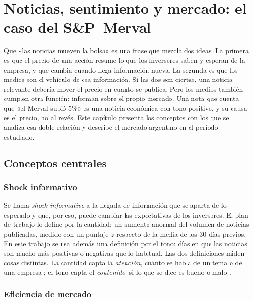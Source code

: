 \chapter{Noticias, sentimiento y mercado: el caso del S\&P~Merval}
\label{cap:marco}

Que «las noticias mueven la bolsa» es una frase que mezcla dos ideas. La primera es que el
precio de una acción resume lo que los inversores saben y esperan de la empresa, y que cambia
cuando llega información nueva. La segunda es que los medios son el vehículo de esa
información. Si las dos son ciertas, una noticia relevante debería mover el precio en cuanto
se publica. Pero los medios también cumplen otra función: informan sobre el propio mercado.
Una nota que cuenta que «el Merval subió 5\%» es una noticia económica con tono positivo, y
su causa es el precio, no al revés. Este capítulo presenta los conceptos con los que se
analiza esa doble relación y describe el mercado argentino en el período estudiado.

\section{Conceptos centrales}
\label{sec:conceptos}

\subsection{Shock informativo}

Se llama \textit{shock informativo} a la llegada de información que se aparta de lo esperado
y que, por eso, puede cambiar las expectativas de los inversores. El plan de trabajo lo define
por la cantidad: un aumento anormal del volumen de noticias publicadas, medido con un puntaje
$z$ respecto de la media de los 30 días previos. En este trabajo se usa además una definición
por el tono: días en que las noticias son mucho más positivas o negativas que lo habitual. Las
dos definiciones miden cosas distintas. La cantidad capta la \textit{atención}, cuánto se habla
de un tema o de una empresa \citep{da2011,fang2009,cao2025hype}; el tono capta el
\textit{contenido}, si lo que se dice es bueno o malo \citep{tetlock2007,ardia2022}.

\subsection{Eficiencia de mercado}

